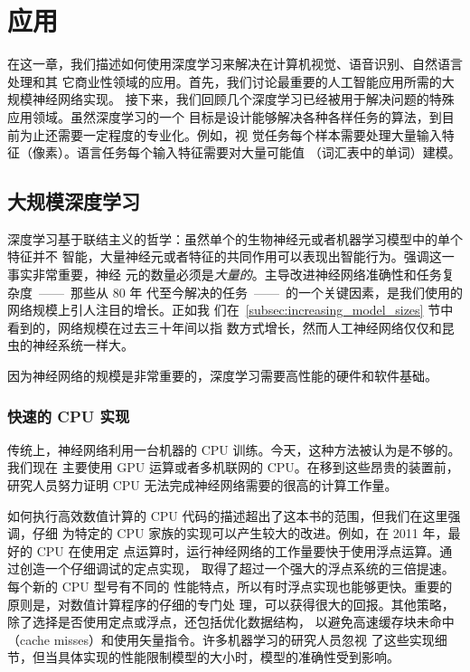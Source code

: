 \chapter{应用}
\label{ch:applications}

在这一章，我们描述如何使用深度学习来解决在计算机视觉、语音识别、自然语言处理和其
它商业性领域的应用。首先，我们讨论最重要的人工智能应用所需的大规模神经网络实现。
接下来，我们回顾几个深度学习已经被用于解决问题的特殊应用领域。虽然深度学习的一个
目标是设计能够解决各种各样任务的算法，到目前为止还需要一定程度的专业化。例如，视
觉任务每个样本需要处理大量输入特征（像素）。语言任务每个输入特征需要对大量可能值
（词汇表中的单词）建模。

\section{大规模深度学习}
\label{sec:large_scale_deep_learning}

深度学习基于联结主义的哲学：虽然单个的生物神经元或者机器学习模型中的单个特征并不
智能，大量神经元或者特征的共同作用可以表现出智能行为。强调这一事实非常重要，神经
元的数量必须是\emph{大量的}。主导改进神经网络准确性和任务复杂度~——~那些从 80 年
代至今解决的任务~——~的一个关键因素，是我们使用的网络规模上引人注目的增长。正如我
们在~\ref{subsec:increasing_model_sizes} 节中看到的，网络规模在过去三十年间以指
数方式增长，然而人工神经网络仅仅和昆虫的神经系统一样大。

因为神经网络的规模是非常重要的，深度学习需要高性能的硬件和软件基础。

\subsection{快速的 CPU 实现}
\label{subsec:fast_cpu_implementations}

传统上，神经网络利用一台机器的 CPU 训练。今天，这种方法被认为是不够的。我们现在
主要使用 GPU 运算或者多机联网的 CPU。在移到这些昂贵的装置前，研究人员努力证明
CPU 无法完成神经网络需要的很高的计算工作量。

如何执行高效数值计算的 CPU 代码的描述超出了这本书的范围，但我们在这里强调，仔细
为特定的 CPU 家族的实现可以产生较大的改进。例如，在 2011 年，最好的 CPU 在使用定
点运算时，运行神经网络的工作量要快于使用浮点运算。通过创造一个仔细调试的定点实现，
\citet{37631} 取得了超过一个强大的浮点系统的三倍提速。每个新的 CPU 型号有不同的
性能特点，所以有时浮点实现也能够更快。重要的原则是，对数值计算程序的仔细的专门处
理，可以获得很大的回报。其他策略，除了选择是否使用定点或浮点，还包括优化数据结构，
以避免高速缓存块未命中（cache misses）和使用矢量指令。许多机器学习的研究人员忽视
了这些实现细节，但当具体实现的性能限制模型的大小时，模型的准确性受到影响。

